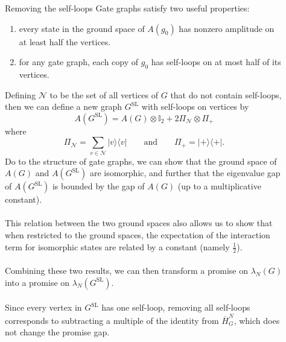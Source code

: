 \documentclass{beamer}
\newlength{\sepwid}
\newlength{\onecolwid}
\newcommand{\sbra}[1]{\langle{#1}|}
\newcommand{\sket}[1]{|{#1}\rangle}
\newcommand{\II}{\mathbb{I}}
\begin{document}
\begin{frame}[t]
\begin{columns}[t]
\begin{column}{\onecolwid}
    
  
\end{column}

\begin{column}{\sepwid}\end{column}



\begin{column}{\onecolwid}

\begin{block}{Removing the self-loops}
    Gate graphs satisfy two useful properties:
    \begin{enumerate}
      \item every state in the ground space of $A(g_0)$ has nonzero amplitude on at least half the vertices.
      \item for any gate graph, each copy of $g_0$ has self-loops on at most half of its vertices. 
    \end{enumerate} 
    
    Defining $\mathcal{N}$ to be the set of all vertices of $G$ that do not contain self-loops, then we can define a new graph $G^{\text{SL}}$ with self-loops on  vertices by
    \[
      A(G^{\text{SL}}) = A(G) \otimes \II_2 + 2 \Pi_\mathcal{N} \otimes \Pi_+
    \]
    where 
    \[
      \Pi_{\mathcal{N}} = \sum_{v\in\mathcal{N}} \sket{v}\sbra{v} \qquad{\text{and}}\qquad \Pi_+ = \sket{+}\sbra{+}.
    \]
    Do to the structure of gate graphs, we can show that the ground space of $A(G)$ and $A(G^{\text{SL}})$ are isomorphic, and further that the eigenvalue gap of $A(G^{\text{SL}})$ is bounded by the gap of $A(G)$ (up to a multiplicative constant).
    \\~\\
    This relation between the two ground spaces also allows us to show that when restricted to the ground spaces, the expectation of the interaction term for isomorphic states are related by a constant (namely $\frac{1}{2}$).
    \\~\\
    Combining these two results, we can then transform a promise on $\lambda_N(G)$ into a promise on $\lambda_N(G^{\text{SL}})$. 
    \\~\\
    Since every vertex in $G^{\text{SL}}$ has one self-loop, removing all self-loops corresponds to subtracting a multiple of the identity from $\overline{H}_G^N$, which does not change the promise gap.
  \end{block}


\end{column}
\end{columns}
\end{frame}
\end{document}
